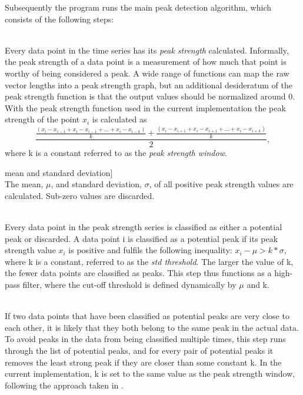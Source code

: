 Subsequently the program runs the main peak detection algorithm, which consists of the following steps:
\begin{description}

\item[Calculate peak strength] \hfill \\
Every data point in the time series has its \emph{peak strength} calculated. Informally, the peak strength of a data point is a measurement of how much that point is worthy of being considered a peak. A wide range of functions can map the raw vector lengths into a peak strength graph, but an additional desideratum of the peak strength function is that the output values should be normalized around 0. With the peak strength function used in the current implementation the peak strength of the point $x_i$ is calculated as $$\frac{\frac{(x_{i} - x_{i-1} + x_{i} - x_{i-1} + \ldots + x_{i} - x_{i-k})}{k} + \frac{(x_{i} - x_{i+1} + x_{i} - x_{i+1} + \ldots + x_{i} - x_{i+k})}{k}}{2},$$ where k is a constant referred to as the \emph{peak strength window}. 

\item mean and standard deviation] \hfill \\
The mean, $\mu$, and standard deviation, $\sigma$, of all positive peak strength values are calculated. Sub-zero values are discarded.

\item[Search for potential peaks] \hfill \\
Every data point in the peak strength series is classified as either a potential peak or discarded. A data point i is classified as a potential peak if its peak strength value $x_i$ is positive and fulfils the following inequality: $x_i - \mu > k * \sigma$, where k is a constant, referred to as the \emph{std threshold}. The larger the value of k, the fewer data points are classified as peaks. This step thus functions as a high-pass filter, where the cut-off threshold is defined dynamically by $\mu$ and k.

\item[Remove close peaks] \hfill \\
If two data points that have been classified as potential peaks are very close to each other, it is likely that they both belong to the same peak in the actual data. To avoid peaks in the data from being classified multiple times, this step runs through the list of potential peaks, and for every pair of potential peaks it removes the least strong peak if they are closer than some constant k. In the current implementation, k is set to the same value as the peak strength window, following the approach taken in \cite{SimplePeakDetect}.

\end{description}

